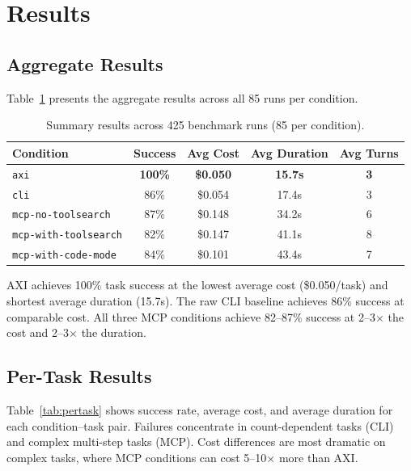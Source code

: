 \documentclass{article}
\begin{document}
\section{Results}
\label{sec:results}

\subsection{Aggregate Results}

Table~\ref{tab:summary} presents the aggregate results across all 85 runs
per condition.

\begin{table}[t]
\centering
\caption{Summary results across 425 benchmark runs (85 per condition).}
\label{tab:summary}
\begin{tabular}{@{}lcccc@{}}
\toprule
Condition & Success & Avg Cost & Avg Duration & Avg Turns \\
\midrule
\texttt{axi}                  & \textbf{100\%} & \textbf{\$0.050} & \textbf{15.7s} & \textbf{3} \\
\texttt{cli}                  & 86\%           & \$0.054          & 17.4s          & 3 \\
\texttt{mcp-no-toolsearch}    & 87\%           & \$0.148          & 34.2s          & 6 \\
\texttt{mcp-with-toolsearch}  & 82\%           & \$0.147          & 41.1s          & 8 \\
\texttt{mcp-with-code-mode}   & 84\%           & \$0.101          & 43.4s          & 7 \\
\bottomrule
\end{tabular}
\end{table}

AXI achieves 100\% task success at the lowest average cost (\$0.050/task)
and shortest average duration (15.7s). The raw CLI baseline achieves 86\%
success at comparable cost. All three MCP conditions achieve 82--87\%
success at 2--3$\times$ the cost and 2--3$\times$ the duration.

\subsection{Per-Task Results}

Table~\ref{tab:pertask} shows success rate, average cost, and average
duration for each condition--task pair. Failures concentrate in
count-dependent tasks (CLI) and complex multi-step tasks (MCP). Cost
differences are most dramatic on complex tasks, where MCP conditions can
cost 5--10$\times$ more than AXI.
\end{document}
